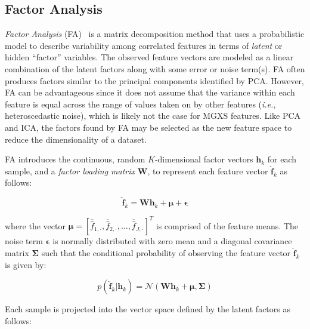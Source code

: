 \subsection{Factor Analysis}
\label{subsec:chap10-factor-analysis}

\textit{Factor Analysis} (FA)~\cite{harman1960factor} is a matrix decomposition method that uses a probabilistic model to describe variability among correlated features in terms of \textit{latent} or hidden ``factor'' variables. The observed feature vectors are modeled as a linear combination of the latent factors along with some error or noise term(s). FA often produces factors similar to the principal components identified by PCA. However, FA can be advantageous since it does not assume that the variance within each feature is equal across the range of values taken on by other features (\textit{i.e.}, heteroscedastic noise), which is likely not the case for \ac{MGXS} features. Like PCA and ICA, the factors found by FA may be selected as the new feature space to reduce the dimensionality of a dataset.

FA introduces the continuous, random $K$-dimensional factor vectors $\boldsymbol{h}_{k}$ for each sample, and a \textit{factor loading matrix} $\boldsymbol{W}$, to represent each feature vector $\boldsymbol{\hat{f}}_{k}$ as follows:

\begin{equation}
\label{eqn:chap10-fa-project}
\boldsymbol{\hat{f}}_{k} = \boldsymbol{W}\boldsymbol{h}_{k} + \boldsymbol{\mu} + \boldsymbol{\epsilon}
\end{equation}

\noindent where the vector $\boldsymbol{\mu} = \left[\overline{\hat{f}}_{1,\cdot}, \overline{\hat{f}}_{2,\cdot}, \dots, \overline{\hat{f}}_{J,\cdot}\right]^{T} $ is comprised of the feature means. The noise term $\boldsymbol{\epsilon}$ is normally distributed with zero mean and a diagonal covariance matrix $\boldsymbol{\Sigma}$ such that the conditional probability of observing the feature vector $\boldsymbol{\hat{f}}_{k}$ is given by:

\begin{equation}
\label{eqn:chap10-fa-prob}
p\left(\boldsymbol{\hat{f}}_{k}|\boldsymbol{h}_{k}\right) = \mathcal{N}\left(\boldsymbol{W}\boldsymbol{h}_{k} + \boldsymbol{\mu}, \boldsymbol{\Sigma}\right)
\end{equation}

\noindent Each sample is projected into the vector space defined by the latent factors as follows:

